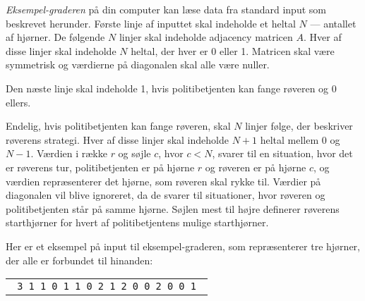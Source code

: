\documentclass{boi2014-dk}
\begin{document}
    \Experimentation
    {\em Eksempel-graderen} på din computer kan læse data fra standard input
    som beskrevet herunder.
    Første linje af inputtet skal indeholde et heltal $N$ --- antallet af
    hjørner. De følgende $N$ linjer skal indeholde adjacency matricen $A$.
    Hver af disse linjer skal indeholde $N$ heltal, der hver er 0 eller 1.
    Matricen skal være symmetrisk og værdierne på diagonalen skal alle
    være nuller.

    Den næste linje skal indeholde 1, hvis politibetjenten kan fange røveren
    og 0 ellers.

    Endelig, hvis politibetjenten kan fange røveren, skal $N$ linjer følge,
    der beskriver røverens strategi. Hver af disse linjer skal indeholde
    $N+1$ heltal mellem $0$ og $N-1$. Værdien i række $r$ og søjle $c$,
    hvor $c < N$, svarer til en situation, hvor det er røverens tur,
    politibetjenten er på hjørne $r$ og røveren er på hjørne $c$, og værdien
    repræsenterer det hjørne, som røveren skal rykke til. Værdier på
    diagonalen vil blive ignoreret, da de svarer til situationer, hvor
    røveren og politibetjenten står på samme hjørne. Søjlen mest til højre
    definerer røverens starthjørner for hvert af politibetjentens mulige
    starthjørner.

    Her er et eksempel på input til eksempel-graderen, som repræsenterer tre
    hjørner, der alle er forbundet til hinanden:

    \begin{center}
        \begin{tabular}{p{4cm}}
            {\tt
                3 \newline
                0 1 1 \newline
                1 0 1 \newline
                1 1 0 \newline
                1 \newline
                0 2 1 2 \newline
                2 0 0 2 \newline
                1 0 0 1 \newline
            }
        \end{tabular}
    \end{center}
\end{document}
